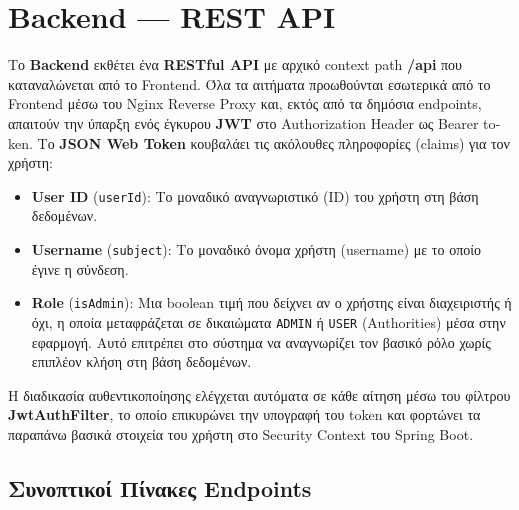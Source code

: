 \documentclass[12pt]{fphw}
\newcommand{\en}[1]{\foreignlanguage{english}{#1}}
\begin{document}
\section{Backend — REST API}
Το \en{\textbf{Backend}} εκθέτει ένα \en{\textbf{RESTful API}} με αρχικό \en{context path} \en{\textbf{/api}} που καταναλώνεται από το \en{Frontend}. Όλα τα αιτήματα προωθούνται εσωτερικά από το Frontend μέσω του \en{Nginx Reverse Proxy} και, εκτός από τα δημόσια endpoints, απαιτούν την ύπαρξη ενός έγκυρου \en{\textbf{JWT}} στο \en{Authorization Header} ως \en{Bearer token}. Το \en{\textbf{JSON Web Token}} κουβαλάει τις ακόλουθες πληροφορίες (\en{claims}) για τον χρήστη:
\begin{itemize}
    \item \en{\textbf{User ID} (\texttt{userId}):} Το μοναδικό αναγνωριστικό (\en{ID}) του χρήστη στη βάση δεδομένων.
    \item \en{\textbf{Username} (\texttt{subject}):} Το μοναδικό όνομα χρήστη (\en{username}) με το οποίο έγινε η σύνδεση.
    \item \en{\textbf{Role} (\texttt{isAdmin}):} Μια \en{boolean} τιμή που δείχνει αν ο χρήστης είναι διαχειριστής ή όχι, η οποία μεταφράζεται σε δικαιώματα \en{\texttt{ADMIN}} ή \en{\texttt{USER}} (\en{Authorities}) μέσα στην εφαρμογή. Αυτό επιτρέπει στο σύστημα να αναγνωρίζει τον βασικό ρόλο χωρίς επιπλέον κλήση στη βάση δεδομένων.
\end{itemize}

Η διαδικασία αυθεντικοποίησης ελέγχεται αυτόματα σε κάθε αίτηση μέσω του φίλτρου \en{\textbf{JwtAuthFilter}}, το οποίο επικυρώνει την υπογραφή του \en{token} και φορτώνει τα παραπάνω βασικά στοιχεία του χρήστη στο \en{Security Context} του \en{Spring Boot}.

\subsection{Συνοπτικοί Πίνακες Endpoints}
\end{document}
